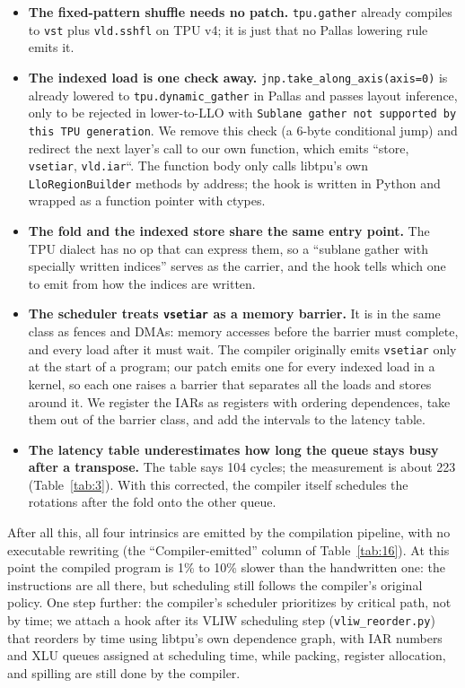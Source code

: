 \documentclass[sigconf,nonacm,balance=false]{acmart}
\newcommand{\code}[1]{\texttt{#1}}
\begin{document}
\begin{itemize}
\item \textbf{The fixed-pattern shuffle needs no patch.} \code{tpu.\allowbreak{}gather} already compiles to \code{vst} plus \code{vld.\allowbreak{}sshfl} on TPU v4; it is just that no Pallas lowering rule emits it.
\item \textbf{The indexed load is one check away.} \code{jnp.\allowbreak{}take\_\allowbreak{}along\_\allowbreak{}axis(\allowbreak{}axis=\allowbreak{}0)} is already lowered to \code{tpu.\allowbreak{}dynamic\_\allowbreak{}gather} in Pallas and passes layout inference, only to be rejected in lower-to-LLO with \code{Sublane gather not supported by this TPU generation}. We remove this check (a 6-byte conditional jump) and redirect the next layer's call to our own function, which emits ``store, \code{vsetiar}, \code{vld.\allowbreak{}iar}``. The function body only calls libtpu's own \code{Llo\allowbreak{}Region\allowbreak{}Builder} methods by address; the hook is written in Python and wrapped as a function pointer with ctypes.
\item \textbf{The fold and the indexed store share the same entry point.} The TPU dialect has no op that can express them, so a ``sublane gather with specially written indices'' serves as the carrier, and the hook tells which one to emit from how the indices are written.
\item \textbf{The scheduler treats \code{vsetiar} as a memory barrier.} It is in the same class as fences and DMAs: memory accesses before the barrier must complete, and every load after it must wait. The compiler originally emits \code{vsetiar} only at the start of a program; our patch emits one for every indexed load in a kernel, so each one raises a barrier that separates all the loads and stores around it. We register the IARs as registers with ordering dependences, take them out of the barrier class, and add the intervals to the latency table.
\item \textbf{The latency table underestimates how long the queue stays busy after a transpose.} The table says 104 cycles; the measurement is about 223 (Table~\ref{tab:3}). With this corrected, the compiler itself schedules the rotations after the fold onto the other queue.
\end{itemize}

After all this, all four intrinsics are emitted by the compilation pipeline, with no executable rewriting (the ``Compiler-emitted'' column of Table~\ref{tab:16}). At this point the compiled program is 1\% to 10\% slower than the handwritten one: the instructions are all there, but scheduling still follows the compiler's original policy. One step further: the compiler's scheduler prioritizes by critical path, not by time; we attach a hook after its VLIW scheduling step (\code{vliw\_\allowbreak{}reorder.\allowbreak{}py}) that reorders by time using libtpu's own dependence graph, with IAR numbers and XLU queues assigned at scheduling time, while packing, register allocation, and spilling are still done by the compiler.
\end{document}
